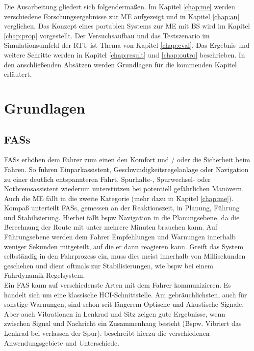 {Die Ausarbeitung gliedert sich folgendermaßen. Im Kapitel \ref{chap:me} werden verschiedene Forschungsergebnisse zur \acl{ME} aufgezeigt und in Kapitel \ref{chap:an} verglichen. Das Konzept eines portablen Systems zur \acl{ME} mit \acl{BS} wird im Kapitel \ref{chap:prop} vorgestellt. Der Versuchsaufbau und das Testszenario im Simulationsumfeld der \acl{RTU} ist Thema von Kapitel \ref{chap:eval}. Das Ergebnis und weitere Schritte werden in Kapitel \ref{chap:result} und \ref{chap:outro} beschrieben. In den anschließenden Absätzen werden Grundlagen für die kommenden Kapitel erläutert. \\

\section{Grundlagen}

\subsection{\acl{FASs}}
\acl{FASs} erhöhen dem Fahrer zum einen den Komfort und / oder die Sicherheit beim Fahren. So führen Einparkassistent,  Geschwindigkeitsregelanlage oder Navigation zu einer deutlich entspannteren Fahrt. Spurhalte-, Spurwechsel- oder Notbremsassistent wiederum unterstützen bei potentiell gefährlichen Manövern. Auch die \acl{ME} fällt in die zweite Kategorie (mehr dazu in Kapitel \ref{chap:me}).\\

Kompaß \cite{fasFuture} unterteilt \acl{FASs}, gemessen an der Reaktionszeit, in Planung, Führung und Stabilisierung. Hierbei fällt \acl{bspw} Navigation in die Planungsebene, da die Berechnung der Route mit unter mehrere Minuten brauchen kann. Auf Führungsebene werden dem Fahrer Empfehlungen und Warnungen innerhalb weniger Sekunden mitgeteilt, auf die er dann reagieren kann. Greift das System selbständig in den Fahrprozess ein, muss dies meist innerhalb von Millisekunden geschehen und dient oftmals zur Stabilisierungen, wie \acl{bspw} bei einem Fahrdynamik-Regelsystem.\\

Ein \acl{FAS} kann auf verschiedenste Arten mit dem Fahrer kommunizieren. Es handelt sich um eine klassische HCI-Schnittstelle. Am gebräuchlichsten, auch für sonstige Warnungen, sind schon seit längerem Optische und Akustische Signale. Aber auch Vibrationen in Lenkrad und Sitz zeigen gute Ergebnisse, wenn zwischen Signal und Nachricht ein Zusammenhang besteht (Bspw. Vibriert das Lenkrad bei verlassen der Spur).
\cite{Bertoldi:2010:MAD:2002368.2002370} beschreibt hierzu die verschiedenen Anwendungsgebiete und Unterschiede. \\

}
